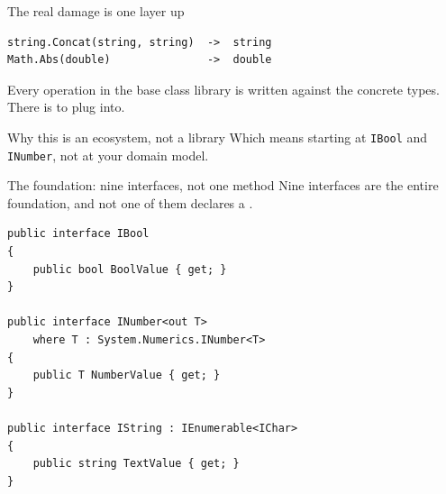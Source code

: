 \documentclass[aspectratio=169,10pt,t]{beamer}
\begin{document}
\begin{frame}[fragile]{The real damage is one layer up}
  \vspace{0.6em}
\begin{lstlisting}
string.Concat(string, string)  ->  string
Math.Abs(double)               ->  double
\end{lstlisting}
  \vspace{1.0em}
  Every operation in the base class library is written against the concrete
  types. There is  to plug into.

  \vspace{0.9em}
\end{frame}

\begin{frame}{Why this is an ecosystem, not a library}
  \slidetop
  Which means starting at \texttt{IBool} and \texttt{INumber}, not at your
  domain model.

  \slidegap
\end{frame}

\begin{frame}[fragile]{The foundation: nine interfaces, not one method}
  \vspace{0.4em}
  Nine interfaces are the entire foundation, and not one of them declares a
  .
  \vspace{0.4em}
\begin{lstlisting}[basicstyle=\ttfamily\scriptsize]
public interface IBool
{
    public bool BoolValue { get; }
}

public interface INumber<out T>
    where T : System.Numerics.INumber<T>
{
    public T NumberValue { get; }
}

public interface IString : IEnumerable<IChar>
{
    public string TextValue { get; }
}
\end{lstlisting}
  \vspace{0.3em}
\end{frame}
\end{document}
